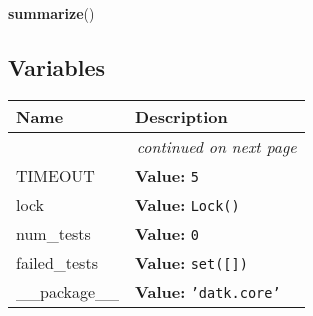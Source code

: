     \label{datk:core:tester:summarize}

    \vspace{0.5ex}

\hspace{.8\funcindent}\begin{boxedminipage}{\funcwidth}

    \raggedright \textbf{summarize}()

\setlength{\parskip}{2ex}
\setlength{\parskip}{1ex}
    \end{boxedminipage}



  \subsection{Variables}

    \vspace{-1cm}
\hspace{\varindent}\begin{longtable}{|p{\varnamewidth}|p{\vardescrwidth}|l}
\cline{1-2}
\cline{1-2} \centering \textbf{Name} & \centering \textbf{Description}& \\
\cline{1-2}
\endhead\cline{1-2}\multicolumn{3}{r}{\small\textit{continued on next page}}\\\endfoot\cline{1-2}
\endlastfoot\raggedright T\-I\-M\-E\-O\-U\-T\- & \raggedright \textbf{Value:} 
{\tt 5}&\\
\cline{1-2}
\raggedright l\-o\-c\-k\- & \raggedright \textbf{Value:} 
{\tt Lock()}&\\
\cline{1-2}
\raggedright n\-u\-m\-\_\-t\-e\-s\-t\-s\- & \raggedright \textbf{Value:} 
{\tt 0}&\\
\cline{1-2}
\raggedright f\-a\-i\-l\-e\-d\-\_\-t\-e\-s\-t\-s\- & \raggedright \textbf{Value:} 
{\tt \texttt{set([}\texttt{])}}&\\
\cline{1-2}
\raggedright \_\-\_\-p\-a\-c\-k\-a\-g\-e\-\_\-\_\- & \raggedright \textbf{Value:} 
{\tt \texttt{'}\texttt{datk.core}\texttt{'}}&\\
\cline{1-2}
\end{longtable}

